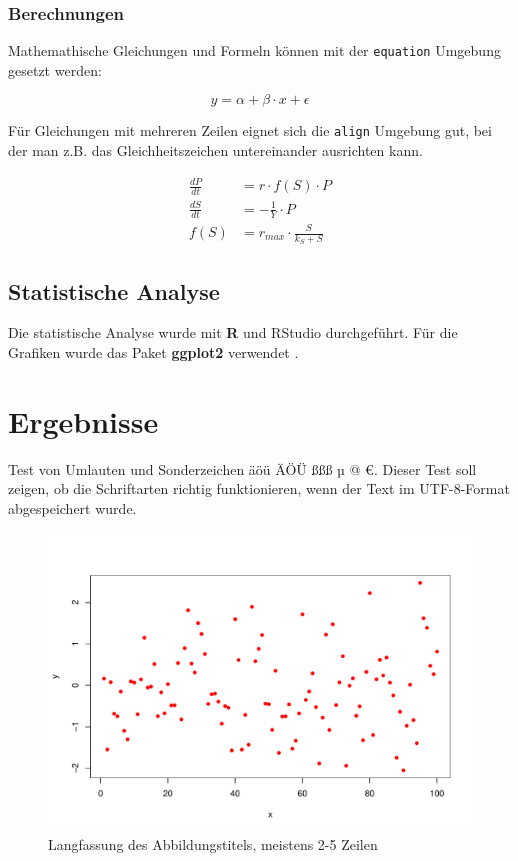 \documentclass[english,ngerman,BCOR=6mm,cdgeometry=no,DIV=13]{tudscrreprt}
\begin{document}
\subsection{Berechnungen}

Mathemathische Gleichungen und Formeln können mit der \texttt{equation} Umgebung gesetzt werden:

\begin{equation}
	y = \alpha + \beta \cdot x + \epsilon
\end{equation}

Für Gleichungen mit mehreren Zeilen eignet sich die \texttt{align} Umgebung gut, bei der man z.B. das Gleichheitszeichen untereinander ausrichten kann.

\begin{align}
\frac{dP}{dt} &= r \cdot f(S) \cdot P \\
\frac{dS}{dt} &= - \frac{1}{Y} \cdot P \\
f(S) &= r_{max} \cdot \frac{S}{k_S + S}
\end{align}


\section{Statistische Analyse}

Die statistische Analyse wurde mit \textbf{R} \parencite{r-core-2024} und RStudio
\parencite{rstudio-2024} durchgeführt. Für die Grafiken
wurde das Paket \textbf{ggplot2} verwendet \parencite{wickham-ggplot2-2016}.


\chapter{Ergebnisse}

Test von Umlauten und Sonderzeichen äöü ÄÖÜ ßßß µ @ €. Dieser Test soll zeigen,
ob die Schriftarten richtig funktionieren, wenn der Text im UTF-8-Format
abgespeichert wurde.

\begin{figure}
	\centering
	\includegraphics[width=\textwidth]{pdf-plot.pdf}
	\caption[Kurzfassung des Abbildungstitels]{Langfassung des Abbildungstitels,
	         meistens 2-5 Zeilen}\label{fig:fig_1}
\end{figure}
\end{document}
